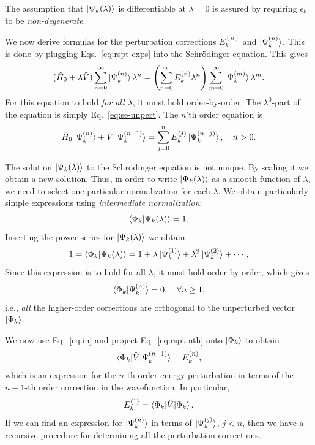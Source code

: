 \documentclass{report}
\theoremstyle{plain}
\theoremstyle{definition}
\begin{document}
The assumption that $\ket{\Psi_k(\lambda)}$ is differentiable at
$\lambda=0$ is assured by requiring $\epsilon_k$ to be
\emph{non-degenerate}. 

We now derive formulas for the perturbation corrections $E_k^{(n)}$ and
$\ket{\Psi_k^{(n)}}$. This is done by plugging
Eqs.~\eqref{eq:rspt-exps} into the Schr\"odinger equation. This gives
\begin{equation}
  (\hat{H}_0 + \lambda \hat{V}) \sum_{n=0}^\infty
  \ket{\Psi_k^{(n)}}\lambda^n = \left(\sum_{n=0}^\infty
    E_k^{(n)}\lambda^n\right) \sum_{m=0}^\infty \ket{\Psi_k^{(m)}}\lambda^m.
\end{equation}
For this equation to hold \emph{for all $\lambda$}, it must hold
order-by-order. The $\lambda^0$-part of the equation is simply
Eq.~\eqref{eq:se-unpert}. The $n$'th order equation is
\begin{equation}
  \hat{H}_0 \ket{\Psi_k^{(n)}} + \hat{V} \ket{\Psi_k^{(n-1)}} =
  \sum_{j=0}^n E_k^{(j)} \ket{\Psi_k^{(n-j)}}, \quad n > 0. \label{eq:rspt-nth}
\end{equation}

The solution $\ket{\Psi_k(\lambda)}$ to the Schr\"odinger equation is not
unique. By scaling it we obtain a new solution. Thus, in order to
write $\ket{\Psi_k(\lambda)}$ as a smooth function of $\lambda$, we need to select one
particular normalization for each $\lambda$. We obtain particularly simple expressions
using \emph{intermediate normalization}:
\begin{equation}
  \braket{\Phi_k|\Psi_k(\lambda)} = 1.
\end{equation}
Inserting the power series for $\ket{\Psi_k(\lambda)}$ we obtain
\begin{equation}
  1 =   \braket{\Phi_k|\Psi_k(\lambda)} = 1 + \lambda \ket{\Psi_k^{(1)}}
   + \lambda^2 \ket{\Psi_k^{(2)}} + \cdots,
\end{equation}
Since this expression is to hold for all $\lambda$, it must hold
order-by-order, which gives
\begin{equation}
  \braket{\Phi_k|\Psi_k^{(n)}} = 0, \quad \forall n\geq 1, \label{eq:in}
\end{equation}
i.e., \emph{all} the higher-order corrections are orthogonal to the
unperturbed vector $\ket{\Phi_k}$.

We now use Eq.~\eqref{eq:in} and project Eq.~\eqref{eq:rspt-nth} onto
$\ket{\Phi_k}$ to obtain
\begin{equation}
  \braket{\Phi_k|\hat{V}|\Psi_k^{(n-1)}} = E_k^{(n)},
\end{equation}
which is an expression for the $n$-th order energy perturbation in
terms of the $n-1$-th order correction in the wavefunction. In
particular,
\begin{equation}
  E_k^{(1)} = \braket{\Phi_k|\hat{V}|\Phi_k}.
\end{equation}
If we can find an expression for $\ket{\Psi_k^{(n)}}$ in terms of
$\ket{\Psi_k^{(j)}}$, $j < n$, then we have a recursive procedure for
determining all the perturbation corrections.
\end{document}
